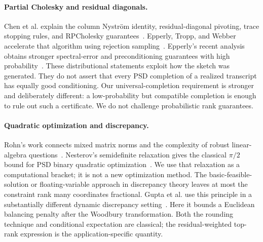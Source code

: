 \documentclass[final,leqno,letterpaper]{etna}
\begin{document}
\paragraph{Partial Cholesky and residual diagonals.}
Chen et al. explain the column Nystr\"om identity, residual-diagonal pivoting, trace stopping rules, and RPCholesky guarantees~\cite{chen}. Epperly, Tropp, and Webber accelerate that algorithm using rejection sampling~\cite{accelerated}. Epperly's recent analysis obtains stronger spectral-error and preconditioning guarantees with high probability~\cite{epperly2026}. These distributional statements exploit how the sketch was generated. They do not assert that every PSD completion of a realized transcript has equally good conditioning. Our universal-completion requirement is stronger and deliberately different: a low-probability but compatible completion is enough to rule out such a certificate. We do not challenge probabilistic rank guarantees.

\paragraph{Quadratic optimization and discrepancy.}
Rohn's work connects mixed matrix norms and the complexity of robust linear-algebra questions~\cite{rohn}. Nesterov's semidefinite relaxation gives the classical $\pi/2$ bound for PSD binary quadratic optimization~\cite{nesterov}. We use that relaxation as a computational bracket; it is not a new optimization method. The basic-feasible-solution or floating-variable approach in discrepancy theory leaves at most the constraint rank many coordinates fractional. Gupta et al. use this principle in a substantially different dynamic discrepancy setting~\cite{discrepancy}. Here it bounds a Euclidean balancing penalty after the Woodbury transformation. Both the rounding technique and conditional expectation are classical; the residual-weighted top-rank expression is the application-specific quantity.
\end{document}
